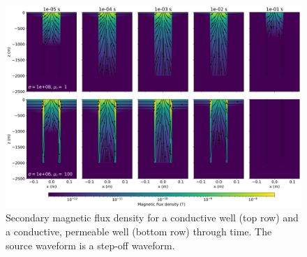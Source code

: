 \begin{figure}
    \begin{center}
    \includegraphics[width=\columnwidth]{figures/btdem.png}
    \end{center}
\caption{
    Secondary magnetic flux density for a conductive well (top row) and a conductive, permeable well (bottom row) through time.
    The source waveform is a step-off waveform.
}
\label{fig:btdem}
\end{figure}
